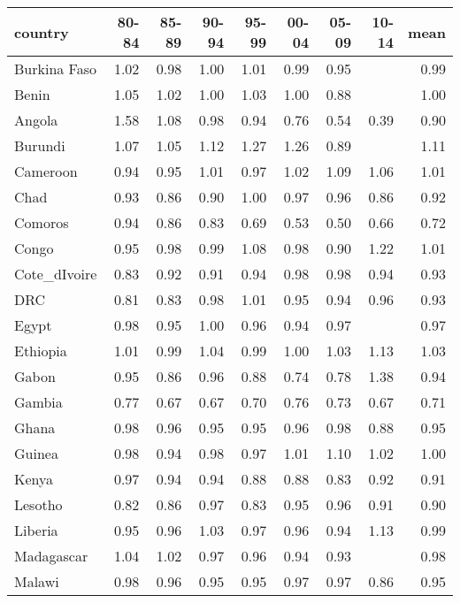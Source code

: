 \begin{table}[ht]
\centering
\begin{tabular}{lrrrrrrrr}
  \hline
country & 80-84 & 85-89 & 90-94 & 95-99 & 00-04 & 05-09 & 10-14 & mean \\ 
  \hline
Burkina Faso & 1.02 & 0.98 & 1.00 & 1.01 & 0.99 & 0.95 &  & 0.99 \\ 
  Benin & 1.05 & 1.02 & 1.00 & 1.03 & 1.00 & 0.88 &  & 1.00 \\ 
  Angola & 1.58 & 1.08 & 0.98 & 0.94 & 0.76 & 0.54 & 0.39 & 0.90 \\ 
  Burundi & 1.07 & 1.05 & 1.12 & 1.27 & 1.26 & 0.89 &  & 1.11 \\ 
  Cameroon & 0.94 & 0.95 & 1.01 & 0.97 & 1.02 & 1.09 & 1.06 & 1.01 \\ 
  Chad & 0.93 & 0.86 & 0.90 & 1.00 & 0.97 & 0.96 & 0.86 & 0.92 \\ 
  Comoros & 0.94 & 0.86 & 0.83 & 0.69 & 0.53 & 0.50 & 0.66 & 0.72 \\ 
  Congo & 0.95 & 0.98 & 0.99 & 1.08 & 0.98 & 0.90 & 1.22 & 1.01 \\ 
  Cote\_dIvoire & 0.83 & 0.92 & 0.91 & 0.94 & 0.98 & 0.98 & 0.94 & 0.93 \\ 
  DRC & 0.81 & 0.83 & 0.98 & 1.01 & 0.95 & 0.94 & 0.96 & 0.93 \\ 
  Egypt & 0.98 & 0.95 & 1.00 & 0.96 & 0.94 & 0.97 &  & 0.97 \\ 
  Ethiopia & 1.01 & 0.99 & 1.04 & 0.99 & 1.00 & 1.03 & 1.13 & 1.03 \\ 
  Gabon & 0.95 & 0.86 & 0.96 & 0.88 & 0.74 & 0.78 & 1.38 & 0.94 \\ 
  Gambia & 0.77 & 0.67 & 0.67 & 0.70 & 0.76 & 0.73 & 0.67 & 0.71 \\ 
  Ghana & 0.98 & 0.96 & 0.95 & 0.95 & 0.96 & 0.98 & 0.88 & 0.95 \\ 
  Guinea & 0.98 & 0.94 & 0.98 & 0.97 & 1.01 & 1.10 & 1.02 & 1.00 \\ 
  Kenya & 0.97 & 0.94 & 0.94 & 0.88 & 0.88 & 0.83 & 0.92 & 0.91 \\ 
  Lesotho & 0.82 & 0.86 & 0.97 & 0.83 & 0.95 & 0.96 & 0.91 & 0.90 \\ 
  Liberia & 0.95 & 0.96 & 1.03 & 0.97 & 0.96 & 0.94 & 1.13 & 0.99 \\ 
  Madagascar & 1.04 & 1.02 & 0.97 & 0.96 & 0.94 & 0.93 &  & 0.98 \\ 
  Malawi & 0.98 & 0.96 & 0.95 & 0.95 & 0.97 & 0.97 & 0.86 & 0.95 \\ 

\end{tabular}
\end{table}
